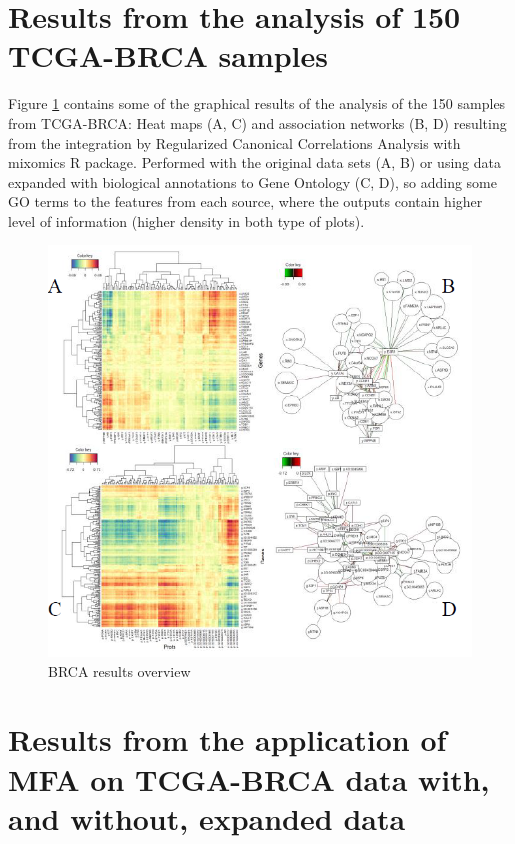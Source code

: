 \documentclass[a4paper, nobind]{templates/ociamthesis}
\begin{document}
\hypertarget{results-from-the-analysis-of-150-tcga-brca-samples}{%
\section{Results from the analysis of 150 TCGA-BRCA samples}\label{results-from-the-analysis-of-150-tcga-brca-samples}}

Figure \ref{fig:fig4-2} contains some of the graphical results of the analysis of the 150 samples from TCGA-BRCA: Heat maps (A, C) and association networks (B, D) resulting from the integration by Regularized Canonical Correlations Analysis with mixomics R package. Performed with the original data sets (A, B) or using data expanded with biological annotations to Gene Ontology (C, D), so adding some GO terms to the features from each source, where the outputs contain higher level of information (higher density in both type of plots).

\begin{figure}

{\centering \includegraphics[width=0.95\linewidth]{figures/chapter4/4-2_BRCA_results_overview} 

}

\caption{BRCA results overview}\label{fig:fig4-2}
\end{figure}

\hypertarget{results-from-the-application-of-mfa-on-tcga-brca-data-with-and-without-expanded-data}{%
\section{Results from the application of MFA on TCGA-BRCA data with, and without, expanded data}\label{results-from-the-application-of-mfa-on-tcga-brca-data-with-and-without-expanded-data}}
\end{document}
